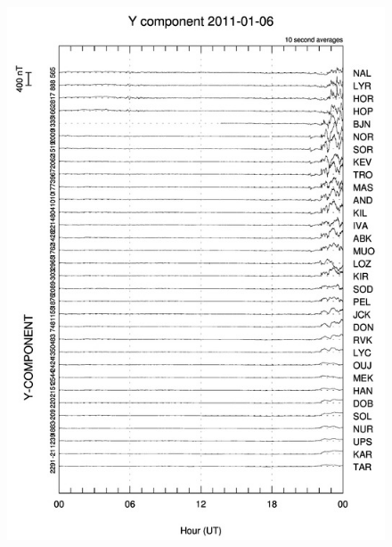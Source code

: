 \documentclass[norsk,a4paper,12pt]{article}
\begin{document}
\begin{multicols}{2}
\begin{figure}[H]
	\includegraphics[scale = 0.9]{Figures/Y_gram.jpg}

\end{figure}
\end{multicols}
\end{document}
